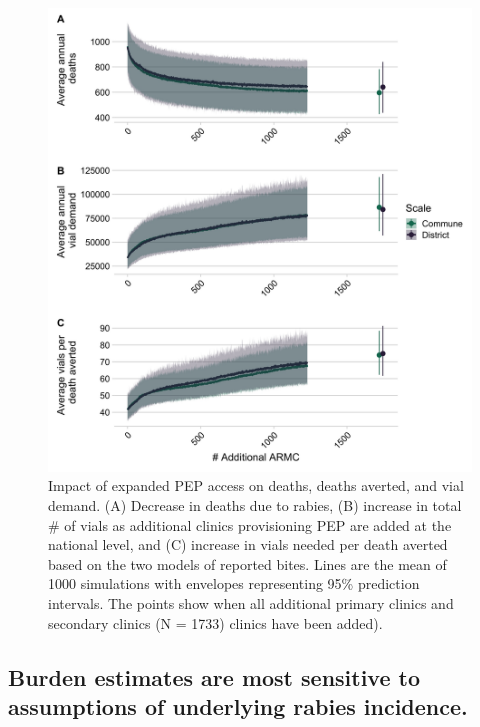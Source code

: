 \documentclass[
  oneside]{book}
\begin{document}
\begin{figure}
\includegraphics[width=0.9\linewidth]{figs/ch2/fig6} \caption[Impact of expanded PEP access on deaths, deaths averted, and vial demand.]{Impact of expanded PEP access on deaths, deaths averted, and vial demand. (A) Decrease in deaths due to rabies, (B) increase in total \# of vials
as additional clinics provisioning PEP are added at the national level,
and (C) increase in vials needed per death averted based on the two
models of reported bites. Lines are the mean of 1000 simulations with
envelopes representing 95\% prediction intervals. The points show when
all additional primary clinics and secondary clinics (N = 1733) clinics
have been added).}\label{fig:ch3-fig6}
\end{figure}









\hypertarget{burden-estimates-are-most-sensitive-to-assumptions-of-underlying-rabies-incidence.}{%
\subsection{Burden estimates are most sensitive to assumptions of underlying rabies incidence.}\label{burden-estimates-are-most-sensitive-to-assumptions-of-underlying-rabies-incidence.}}
\end{document}
